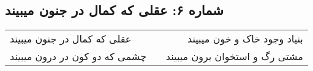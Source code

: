 \begin{center}
\section*{شماره ۶: عقلی که کمال در جنون میبیند}
\label{sec:006}
\begin{longtable}{l p{0.5cm} r}
عقلی که کمال در جنون میبیند
&&
بنیاد وجود خاک و خون میبیند
\\
چشمی که دو کون در درون میبیند
&&
مشتی رگ و استخوان برون میبیند
\\
\end{longtable}
\end{center}
